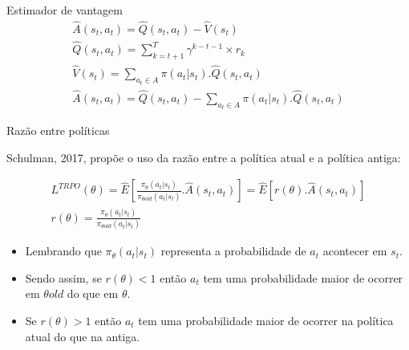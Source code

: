 \documentclass{beamer}
\begin{document}
\begin{frame}{Estimador de vantagem}
\begin{eqnarray}
	\hat{A}(s_{t},a_{t}) = \hat{Q}(s_{t},a_{t}) - \hat{V}(s_{t}) \nonumber \\
	\hat{Q}(s_{t},a_{t}) = \sum_{k=t+1}^{T} \gamma^{k-t-1} \times r_{k} \nonumber \\
	\hat{V}(s_{t}) = \sum_{a_{t} \in A} \pi (a_{t}|s_{t}).\hat{Q}(s_{t},a_{t}) \nonumber \\
	\hat{A}(s_{t},a_{t}) = \hat{Q}(s_{t},a_{t}) - \sum_{a_{t} \in A} \pi (a_{t}|s_{t}).\hat{Q}(s_{t},a_{t}) 
\end{eqnarray}	
\end{frame}


\begin{frame}{Razão entre políticas}
	
	Schulman, 2017, propõe o uso da razão entre a política atual e a política antiga: 
	
	\begin{eqnarray}
	L^{TRPO}(\theta) = \hat{E} \left[\frac{\pi_{\theta}(a_{t}|s_{t})}{\pi_{\theta old}(a_{t}|s_{t})}.\hat{A}(s_{t},a_{t}) \right] = \hat{E}  \left[ r(\theta). \hat{A}(s_{t},a_{t}) \right] \\	
	r(\theta) = \frac{\pi_{\theta}(a_{t}|s_{t})}{\pi_{\theta old}(a_{t}|s_{t})} 
	\end{eqnarray}


\begin{itemize}
	\item Lembrando que $\pi_{\theta}(a_{t}|s_{t})$ representa a probabilidade de $a_{t}$ acontecer em $s_{t}$.
	\item Sendo assim, se $r(\theta) < 1$ então $a_{t}$ tem uma probabilidade maior de ocorrer em $\theta old$ do que em $\theta$.
	\item Se $r(\theta) > 1$ então $a_{t}$ tem uma probabilidade maior de ocorrer na política atual do que na antiga. 
\end{itemize}

\end{frame}
\end{document}
